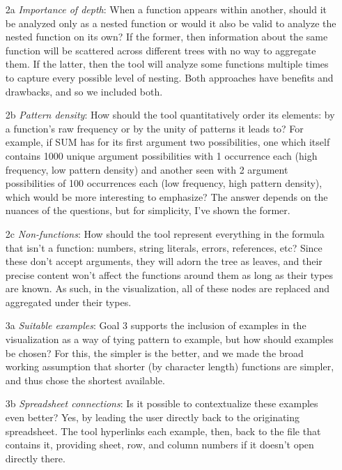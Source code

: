 \documentclass[conference]{IEEEtran}
\begin{document}
\begin{itemize}
	\item [2a] \textit{Importance of depth}: When a function appears within another, should it be analyzed only as a nested function or would it also be valid to analyze the nested function on its own? If the former, then information about the same function will be scattered across different trees with no way to aggregate them. If the latter, then the tool will analyze some functions multiple times to capture every possible level of nesting. Both approaches have benefits and drawbacks, and so we included both.
	\item [2b] \textit{Pattern density}: How should the tool quantitatively order its elements: by a function's raw frequency or by the unity of patterns it leads to? For example, if SUM has for its first argument two possibilities, one which itself contains 1000 unique argument possibilities with 1 occurrence each (high frequency, low pattern density) and another seen with 2 argument possibilities of 100 occurrences each (low frequency, high pattern density), which would be more interesting to emphasize? The answer depends on the nuances of the questions, but for simplicity, I've shown the former.
	\item [2c] \textit{Non-functions}: How should the tool represent everything in the formula that isn't a function: numbers, string literals, errors, references, etc? Since these don't accept arguments, they will adorn the tree as leaves, and their precise content won't affect the functions around them as long as their types are known. As such, in the visualization, all of these nodes are replaced and aggregated under their types.
\end{itemize}

\begin{itemize}
	\item [3a] \textit{Suitable examples}: Goal 3 supports the inclusion of examples in the visualization as a way of tying pattern to example, but how should examples be chosen? For this, the simpler is the better, and we made the broad working assumption that shorter (by character length) functions are simpler, and thus chose the shortest available.
	\item [3b] \textit{Spreadsheet connections}: Is it possible to contextualize these examples even better? Yes, by leading the user directly back to the originating spreadsheet. The tool hyperlinks each example, then, back to the file that contains it, providing sheet, row, and column numbers if it doesn't open directly there.
\end{itemize}
\end{document}
